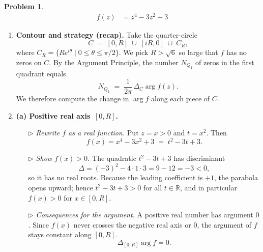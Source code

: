 \documentclass[12pt]{article}
\title{}
\author{Jerich Lee}
\date{\today}
\theoremstyle{definition} %
\newtheorem{problem}{Problem}
\theoremstyle{plain} %
\begin{document}
\maketitle
\begin{problem}
    \begin{align}
        f(z) &= z^{4}-3z^{2}+3
    \end{align}

    \begin{enumerate}

        \item \textbf{Contour and strategy (recap).}  
              Take the quarter‑circle
              $$
                  C \;=\; [0,R]\;\cup\;[iR,0]\;\cup\;C_R,
              $$
              where $C_R=\{Re^{i\theta}\mid0\le\theta\le\pi/2\}$.  
              We pick $R>\sqrt6$ so large that $f$ has no zeros on $C$.  
              By the Argument Principle, the number $N_{Q_1}$ of zeros in the first quadrant equals
              $$
                  N_{Q_1}\;=\;\frac1{2\pi}\,\Delta_C\arg f(z).
              $$
              We therefore compute the change in $\arg f$ along each piece of $C$.

        \item \textbf{(a) Positive real axis $\,[0,R]$.}

              \begin{enumerate}
                  \item[$\triangleright$] \emph{Rewrite $f$ as a real function.}  
                        Put $z=x>0$ and $t=x^{2}$.  Then
                        $$
                            f(x)=x^{4}-3x^{2}+3 \;=\;t^{2}-3t+3.
                        $$
                  \item[$\triangleright$] \emph{Show $f(x)>0$.}  
                        The quadratic $t^{2}-3t+3$ has discriminant
                        $$
                            \Delta=(-3)^{2}-4\cdot1\cdot3 = 9-12 = -3<0,
                        $$
                        so it has no real roots.  Because the leading coefficient is $+1$, the parabola opens upward; hence $t^{2}-3t+3>0$ for all $t\in\mathbb R$, and in particular $f(x)>0$ for $x\in[0,R]$.
                  \item[$\triangleright$] \emph{Consequences for the argument.}  
                        A positive real number has argument $0$.  Since $f(x)$ never crosses the negative real axis or $0$, the argument of $f$ stays constant along $[0,R]$.  
                        $$\Delta_{[0,R]}\arg f = 0.$$
              \end{enumerate}


\end{enumerate}
\end{problem}
\end{document}
